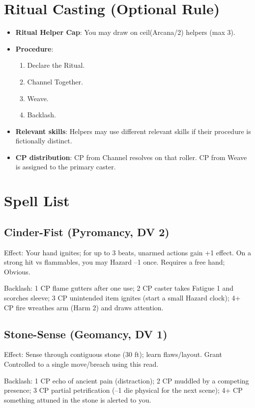 \section{Ritual Casting (Optional Rule)}
\begin{itemize}
    \item \textbf{Ritual Helper Cap}: You may draw on ceil(Arcana/2) helpers (max 3).
    \item \textbf{Procedure}:
    \begin{enumerate}
        \item Declare the Ritual.
        \item Channel Together.
        \item Weave.
        \item Backlash.
    \end{enumerate}
    \item \textbf{Relevant skills}: Helpers may use different relevant skills if their procedure is fictionally distinct.
    \item \textbf{CP distribution}: CP from Channel resolves on that roller. CP from Weave is assigned to the primary caster.
\end{itemize}

\section{Spell List}

\subsection{Cinder-Fist (Pyromancy, DV 2)}
Effect: Your hand ignites; for up to 3 beats, unarmed actions gain +1 effect. On a strong hit vs flammables, you may Hazard --1 once. Requires a free hand; Obvious.

Backlash: 1 CP flame gutters after one use; 2 CP caster takes Fatigue 1 and scorches sleeve; 3 CP unintended item ignites (start a small Hazard clock); 4+ CP fire wreathes arm (Harm 2) and draws attention.

\subsection{Stone-Sense (Geomancy, DV 1)}
Effect: Sense through contiguous stone (30 ft); learn flaws/layout. Grant Controlled to a single move/breach using this read.

Backlash: 1 CP echo of ancient pain (distraction); 2 CP muddled by a competing presence; 3 CP partial petrification (--1 die physical for the next scene); 4+ CP something attuned in the stone is alerted to you.

